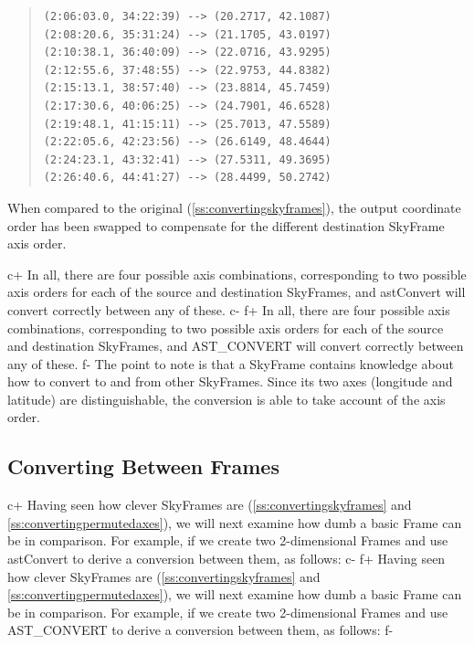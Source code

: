 \documentclass[twoside,11pt]{article}
\newcommand{\secref}[1]{\S\ref{#1}}
\renewcommand{\secref}[1]{\ref{#1}}
\begin{document}
\begin{quote}
\begin{verbatim}
(2:06:03.0, 34:22:39) --> (20.2717, 42.1087)
(2:08:20.6, 35:31:24) --> (21.1705, 43.0197)
(2:10:38.1, 36:40:09) --> (22.0716, 43.9295)
(2:12:55.6, 37:48:55) --> (22.9753, 44.8382)
(2:15:13.1, 38:57:40) --> (23.8814, 45.7459)
(2:17:30.6, 40:06:25) --> (24.7901, 46.6528)
(2:19:48.1, 41:15:11) --> (25.7013, 47.5589)
(2:22:05.6, 42:23:56) --> (26.6149, 48.4644)
(2:24:23.1, 43:32:41) --> (27.5311, 49.3695)
(2:26:40.6, 44:41:27) --> (28.4499, 50.2742)
\end{verbatim}
\end{quote}

When compared to the original (\secref{ss:convertingskyframes}), the
output coordinate order has been swapped to compensate for the
different destination SkyFrame axis order.

c+
In all, there are four possible axis combinations, corresponding to two
possible axis orders for each of the source and destination SkyFrames,
and astConvert will convert correctly between any of these.
c-
f+
In all, there are four possible axis combinations, corresponding to two
possible axis orders for each of the source and destination SkyFrames,
and AST\_CONVERT will convert correctly between any of these.
f-
The point to note is that a SkyFrame contains knowledge about how to
convert to and from other SkyFrames. Since its two axes (longitude and
latitude) are distinguishable, the conversion is able to take account
of the axis order.

\subsection{\label{ss:convertingframes}Converting Between Frames}

c+
Having seen how clever SkyFrames are (\secref{ss:convertingskyframes}
and \secref{ss:convertingpermutedaxes}), we will next examine how dumb
a basic Frame can be in comparison. For example, if we create two
2-dimensional Frames and use astConvert to derive a conversion between
them, as follows:
c-
f+
Having seen how clever SkyFrames are (\secref{ss:convertingskyframes}
and \secref{ss:convertingpermutedaxes}), we will next examine how dumb
a basic Frame can be in comparison. For example, if we create two
2-dimensional Frames and use AST\_CONVERT to derive a conversion
between them, as follows:
f-
\end{document}
